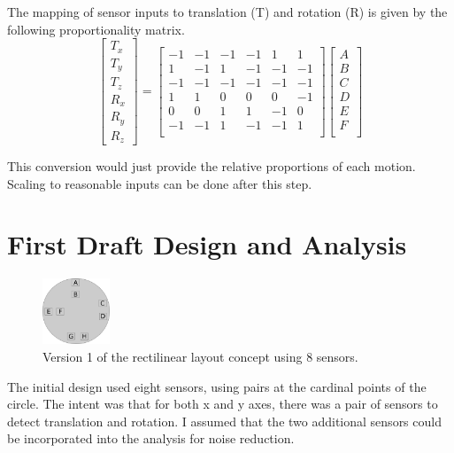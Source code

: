 \documentclass[]{article}
\begin{document}
	The mapping of sensor inputs to translation (T) and rotation (R) is given by the following proportionality matrix. 
		\[
	\begin{bmatrix}
		T_x \\
		T_y \\
		T_z \\
		R_x \\
		R_y \\
		R_z 
	\end{bmatrix} =
	\begin{bmatrix}
		-1 & -1 & -1 & -1 &  1 & 1\\
		1 & -1 & 1 & -1 &  -1 & -1 \\
		-1 & -1 & -1 & -1 &  -1 & -1 \\
		1 & 1 & 0 & 0 & 0 &  -1 \\
		0 & 0 & 1 & 1 &  -1 & 0 \\
		-1 & -1 & 1 &  -1 & -1 & 1 \\
	\end{bmatrix}
	\begin{bmatrix}
		A \\
		B \\
		C \\
		D \\
		E \\
		F \\
	\end{bmatrix}
	\]

	This conversion would just provide the relative proportions of each motion. Scaling to reasonable inputs can be done after this step. 

	\section{First Draft Design and Analysis}
	\begin{figure}
	\begin{center}
		\includegraphics[width=0.18\textwidth]{layout_v1.png}
	\end{center}
	\caption{Version 1 of the rectilinear layout concept using 8 sensors.}
	\label{fig:LayoutV1}
	\end{figure}	
	
	The initial design used eight sensors, using pairs at the cardinal points of the circle. The intent was that for both x and y axes, there was a pair of sensors to detect translation and rotation. I assumed that the two additional sensors could be incorporated into the analysis for noise reduction.
	
\end{document}
